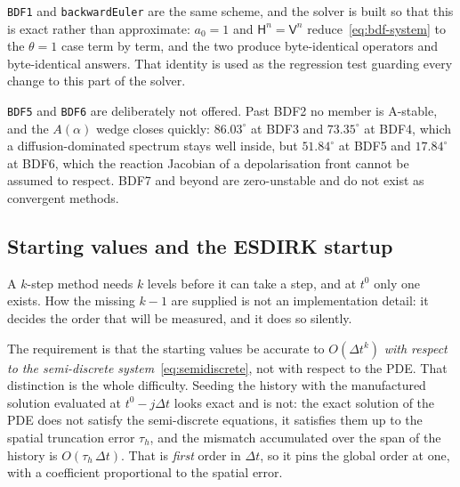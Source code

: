 \documentclass[11pt,a4paper]{article}
\newcommand{\code}[1]{\texttt{\small #1}}
\begin{document}
\code{BDF1} and \code{backwardEuler} are the same scheme, and the solver is
built so that this is exact rather than approximate: $a_0=1$ and
$\mathsf{H}^n=\mathsf{V}^n$ reduce~\eqref{eq:bdf-system} to the $\theta=1$ case
term by term, and the two produce byte-identical operators and byte-identical
answers. That identity is used as the regression test guarding every change to
this part of the solver.

\code{BDF5} and \code{BDF6} are deliberately not offered. Past BDF2 no member is
A-stable, and the $A(\alpha)$ wedge closes quickly: $86.03^\circ$ at BDF3 and
$73.35^\circ$ at BDF4, which a diffusion-dominated spectrum stays well inside,
but $51.84^\circ$ at BDF5 and $17.84^\circ$ at BDF6, which the reaction Jacobian
of a depolarisation front cannot be assumed to respect. BDF7 and beyond are
zero-unstable and do not exist as convergent methods.

\subsection{Starting values and the ESDIRK startup}
\label{sec:bdf-startup}

A $k$-step method needs $k$ levels before it can take a step, and at $t^0$ only
one exists. How the missing $k-1$ are supplied is not an implementation detail:
it decides the order that will be measured, and it does so silently.

The requirement is that the starting values be accurate to $O(\Delta t^k)$
\emph{with respect to the semi-discrete system}~\eqref{eq:semidiscrete}, not
with respect to the PDE. That distinction is the whole difficulty. Seeding the
history with the manufactured solution evaluated at $t^0-j\Delta t$ looks exact
and is not: the exact solution of the PDE does not satisfy the semi-discrete
equations, it satisfies them up to the spatial truncation error $\tau_h$, and
the mismatch accumulated over the span of the history is $O(\tau_h\,\Delta t)$.
That is \emph{first} order in $\Delta t$, so it pins the global order at one,
with a coefficient proportional to the spatial error.
\end{document}

